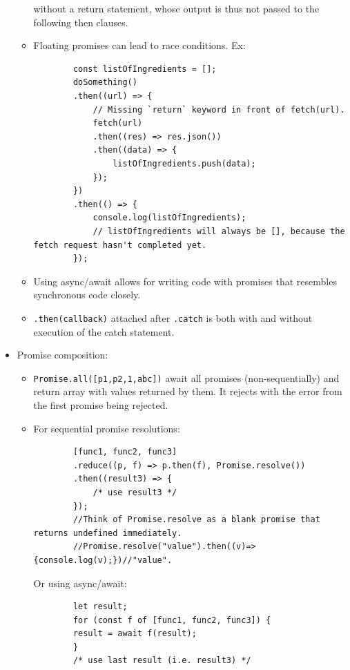 \documentclass{report}
\begin{document}
\begin{itemize}
\begin{itemize}
    without a return statement, whose output is thus not passed to the following then clauses.
    \item Floating promises can lead to race conditions. Ex:
    \begin{lstlisting}
        const listOfIngredients = [];
        doSomething()
        .then((url) => {
            // Missing `return` keyword in front of fetch(url).
            fetch(url)
            .then((res) => res.json())
            .then((data) => {
                listOfIngredients.push(data);
            });
        })
        .then(() => {
            console.log(listOfIngredients);
            // listOfIngredients will always be [], because the fetch request hasn't completed yet.
        });
    \end{lstlisting}
    \item Using async/await allows for writing code with promises that resembles synchronous code closely.
    \item \texttt{.then(callback)} attached after \texttt{.catch} is both with and without execution of the catch statement.
\end{itemize}
\item Promise composition:
\begin{itemize}
    \item \texttt{Promise.all([p1,p2,1,abc])} await all promises (non-sequentially) and return array with values returned by them. It rejects with the error from the first promise being rejected.
    \item For sequential promise resolutions:
    \begin{lstlisting}
        [func1, func2, func3]
        .reduce((p, f) => p.then(f), Promise.resolve())
        .then((result3) => {
            /* use result3 */
        });
        //Think of Promise.resolve as a blank promise that returns undefined immediately.
        //Promise.resolve("value").then((v)=>{console.log(v);})//"value". 
    \end{lstlisting}
    Or using async/await:
    \begin{lstlisting}
        let result;
        for (const f of [func1, func2, func3]) {
        result = await f(result);
        }
        /* use last result (i.e. result3) */


\end{lstlisting}
\end{itemize}
\end{itemize}
\end{document}

